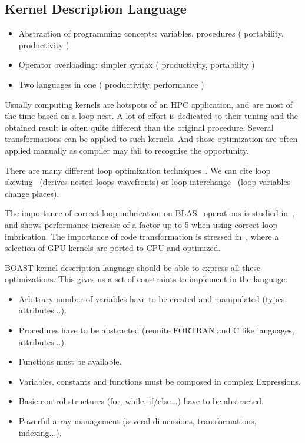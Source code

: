 \documentclass[review]{elsarticle}
\begin{document}
  \cite{videau2013boast}

  \subsection{Kernel Description Language}

  \begin{itemize}
  \item Abstraction of programming concepts: variables, procedures (
portability, productivity )
  \item Operator overloading: simpler syntax ( productivity, portability )
  \item Two languages in one ( productivity, performance ) 
  \end{itemize}

Usually computing kernels are hotspots of an HPC application, and are most of
the time based on a loop nest. A lot of effort is dedicated to their tuning and
the obtained result is often quite different than the original procedure.
Several transformations can be applied to such kernels. And those optimization
are often applied manually as compiler may fail to recognise the opportunity.

There are many different loop optimization techniques~\cite{wolf1991loop}. We
can cite loop skewing~\cite{wolfe1986loops} (derives nested loops wavefronts)
or loop interchange~\cite{allen1984automatic} (loop variables change places).

The importance of  correct loop imbrication on BLAS~\cite{lawson1979basic}
operations is studied in~\cite{soliman2009performance}, and shows performance
increase of a factor up to 5 when using correct loop imbrication. The importance
of code transformation is stressed in~\cite{ye2011porting}, where a selection of GPU
kernels are ported to CPU and optimized.

BOAST kernel description language should be able to express all these
optimizations. This gives us a set of constraints to implement in the language:
\begin{itemize}
\item Arbitrary number of variables have to be created and manipulated (types,
attributes...).
\item Procedures have to be abstracted (reunite FORTRAN and C like languages,
attributes...).
\item Functions must be available.
\item Variables, constants and functions must be composed in complex
Expressions.
\item Basic control structures (for, while, if/else...) have to be abstracted.
\item Powerful array management (several dimensions, transformations,
indexing...).
\end{itemize}
\end{document}

